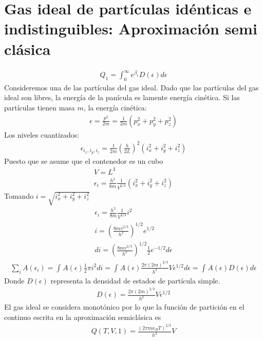 \documentclass{article}
\begin{document}
\section{Gas ideal de partículas idénticas e indistinguibles: Aproximación semi clásica }
\begin{gather*}
  Q_1 = \displaystyle\int_{0 }^{\infty} e ^ {\beta_\epsilon} D(\epsilon) d\epsilon 
\end{gather*}
Consideremos una de las partículas del gas ideal. Dado que las partículas del gas ideal son libres, la energía de la panícula es lamente energía cinética. Si las partículas tienen masa $ m  $, la energía cinética: 
\begin{gather*}
  \epsilon = \frac{p^2 }{2m } = \frac{1}{2m }(p_x^2+ p_y^2 + p_z^2 )
\end{gather*}
Los niveles cuantizados: 
\begin{gather*}
  \epsilon _{i_x, i_y,i_z } = \frac{1}{2m } \left(\frac{h }{2L }\right)^2 (i_x^2 + i_y^2 + i_z^2 )
\end{gather*}
Puesto que se asume que el contenedor es un cubo 
\begin{gather*}
  V = L^3 \\
  \epsilon_i = \frac{h^2 }{8m } \frac{1}{V ^ {2/3 }}(i_x^2 + i_y^2 + i_z^2)
\end{gather*}
Tomando $ i = \sqrt{i_x^2 + i_y^2+ i_z^2}  $ 
\begin{gather*}
  \epsilon_i =  \frac{h^2 }{8m } \frac{1}{V ^ {2/3 }} i^2 \\
  i = \left(\frac{8m v ^ {2/3 }}{h^2 }\right) ^ {1/2 } e ^ {1/2 }\\
  di = \left(\frac{8m v ^ {2/3 }}{h^2 }\right) ^ {1/2 } \frac{1}{2} e ^ {-1/2 } d \epsilon
\end{gather*}
\begin{gather}
  \displaystyle\sum_{i }^{ } A(\epsilon_i ) = \displaystyle\int_{}^{} A(\epsilon) \frac{1}{2} \pi i^2 di = \displaystyle\int_{}^{} A(\epsilon) \frac{2\pi(2m)^ {2/3 } }{h^3 } V \epsilon ^ {1/2 } d\epsilon = \displaystyle\int_{}^{}A(\epsilon) D(\epsilon) d\epsilon
\end{gather}
Donde $ D(\epsilon)  $ representa la densidad de estados de partícula simple.
\begin{gather}
  D(\epsilon) = \frac{2\pi (2m)^ {2/3 }}{h^3 }V \epsilon ^ {1/2 }
\end{gather}
El gas ideal se considera monotónico por lo que la función de partición en el continuo escrita en la aproximación semiclásica es 
\begin{gather}
  Q(T,V,1) = \frac{(2\pi m \kappa_B T)^ {2/3 }}{h^3 } V 
\end{gather}
\end{document}

